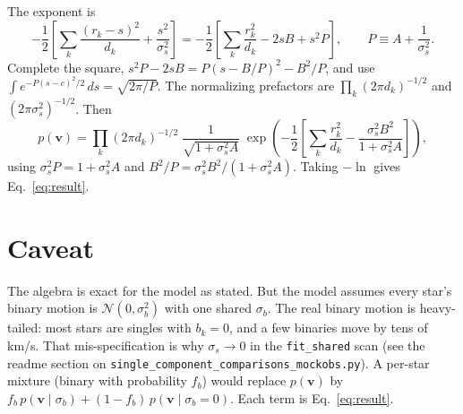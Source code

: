 \documentclass[11pt]{article}
\newcommand{\bv}{\mathbf{v}}
\begin{document}
The exponent is
\begin{equation*}
  -\frac{1}{2}\left[\sum_k\frac{(r_k - s)^2}{d_k} + \frac{s^2}{\sigma_s^2}\right]
  = -\frac{1}{2}\left[\sum_k\frac{r_k^2}{d_k} - 2sB + s^2 P\right], \qquad P \equiv A + \frac{1}{\sigma_s^2}.
\end{equation*}
Complete the square, $s^2P - 2sB = P(s - B/P)^2 - B^2/P$, and use
$\int e^{-P(s-c)^2/2}\,ds = \sqrt{2\pi/P}$.
The normalizing prefactors are $\prod_k(2\pi d_k)^{-1/2}$ and $(2\pi\sigma_s^2)^{-1/2}$. Then
\begin{equation*}
  p(\bv) = \prod_k (2\pi d_k)^{-1/2}\;\frac{1}{\sqrt{1 + \sigma_s^2 A}}\;
  \exp\!\left(-\frac{1}{2}\left[\sum_k \frac{r_k^2}{d_k} - \frac{\sigma_s^2B^2}{1 + \sigma_s^2 A}\right]\right),
\end{equation*}
using $\sigma_s^2 P = 1 + \sigma_s^2 A$ and $B^2/P = \sigma_s^2 B^2/(1 + \sigma_s^2 A)$.
Taking $-\ln$ gives Eq.~\eqref{eq:result}.

\section{Caveat}
The algebra is exact for the model as stated.
But the model assumes every star's binary motion is $\mathcal{N}(0, \sigma_b^2)$ with one shared $\sigma_b$.
The real binary motion is heavy-tailed: most stars are singles with $b_k = 0$, and a few binaries move by tens of km/s.
That mis-specification is why $\sigma_s \to 0$ in the \texttt{fit\_shared} scan
(see the readme section on \texttt{single\_component\_comparisons\_mockobs.py}).
A per-star mixture (binary with probability $f_b$) would replace $p(\bv)$ by
$f_b\, p(\bv \mid \sigma_b) + (1 - f_b)\, p(\bv \mid \sigma_b = 0)$.
Each term is Eq.~\eqref{eq:result}.
\end{document}

